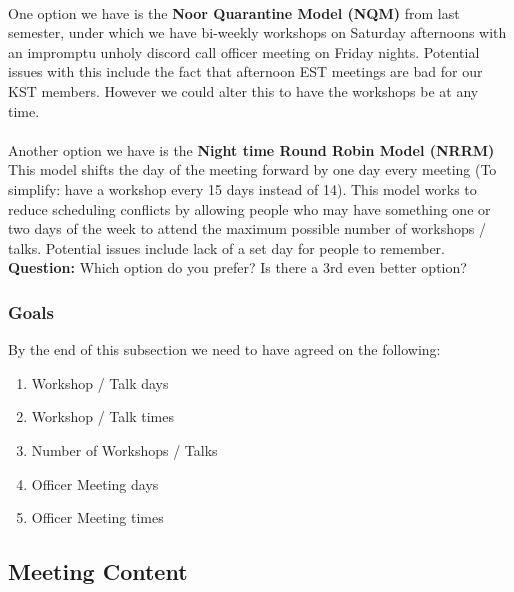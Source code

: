 \documentclass{article}
\begin{document}
\paragraph{}
One option we have is the \textbf{Noor Quarantine Model (NQM)} from last semester, under which we have bi-weekly workshops on Saturday afternoons with an impromptu unholy discord call officer meeting on Friday nights. Potential issues with this include the fact that afternoon EST meetings are bad for our KST members. However we could alter this to have the workshops be at any time.

\paragraph{}
Another option we have is the \textbf{Night time Round Robin Model (NRRM)} This model shifts the day of the meeting forward by one day every meeting (To simplify: have a workshop every 15 days instead of 14). This model works to reduce scheduling conflicts by allowing people who may have something one or two days of the week to attend the maximum possible number of workshops / talks. Potential issues include lack of a set day for people to remember.
\vspace{2mm}\newline
\textbf{Question:} Which option do you prefer? Is there a 3rd even better option? 

\newpage

\subsubsection{Goals}
By the end of this subsection we need to have agreed on the following:
\begin{enumerate}
    \item Workshop / Talk days
    \item Workshop / Talk times
    \item Number of Workshops / Talks
    \item Officer Meeting days
    \item Officer Meeting times
\end{enumerate}

\subsection{Meeting Content}
\end{document}
